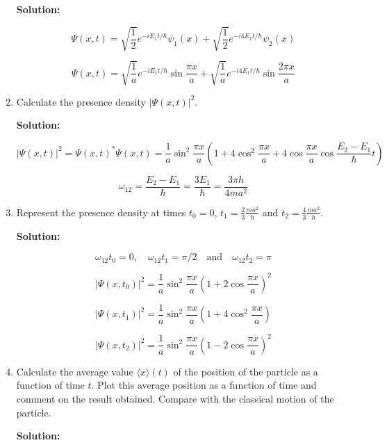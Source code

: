 \documentclass{article}
\begin{document}
\begin{enumerate}
        {\color{red}\textbf{Solution:}

        $$
        \Psi(x, t) = \sqrt{\frac{1}{2}} e^{-i E_{1} t / \hbar} \psi_{1}(x) + \sqrt{\frac{1}{2}} e^{-i 4 E_{1} t / \hbar} \psi_{2}(x)
        $$

        $$
        \Psi(x, t) = \sqrt{\frac{1}{a}} e^{-i E_{1} t / \hbar} \sin \frac{\pi x}{a} + \sqrt{\frac{1}{a}} e^{-i 4 E_{1} t / \hbar} \sin \frac{2 \pi x}{a}
        $$}

        \item Calculate the presence density $|\Psi(x, t)|^{2}$.

        {\color{red}\textbf{Solution:}

        $$
        |\Psi(x, t)|^{2} = \Psi(x, t)^{*} \Psi(x, t) = \frac{1}{a} \sin ^{2} \frac{\pi x}{a} \left(1 + 4 \cos ^{2} \frac{\pi x}{a} + 4 \cos \frac{\pi x}{a} \cos \frac{E_{2} - E_{1}}{\hbar} t\right)
        $$

        $$
        \omega_{12} = \frac{E_{2} - E_{1}}{\hbar} = \frac{3 E_{1}}{\hbar} = \frac{3 \pi h}{4 m a^{2}}
        $$}

        \item Represent the presence density at times $t_{0} = 0$, $t_{1} = \frac{2}{3} \frac{m a^{2}}{h}$ and $t_{2} = \frac{4}{3} \frac{m a^{2}}{h}$.

        {\color{red}\textbf{Solution:}

        $$
        \omega_{12} t_{0} = 0, \quad \omega_{12} t_{1} = \pi / 2 \quad \text{and} \quad \omega_{12} t_{2} = \pi
        $$

        $$
        \left|\Psi\left(x, t_{0}\right)\right|^{2} = \frac{1}{a} \sin ^{2} \frac{\pi x}{a} \left(1 + 2 \cos \frac{\pi x}{a}\right)^{2}
        $$

        $$
        \left|\Psi\left(x, t_{1}\right)\right|^{2} = \frac{1}{a} \sin ^{2} \frac{\pi x}{a} \left(1 + 4 \cos ^{2} \frac{\pi x}{a}\right)
        $$

        $$
        \left|\Psi\left(x, t_{2}\right)\right|^{2} = \frac{1}{a} \sin ^{2} \frac{\pi x}{a} \left(1 - 2 \cos \frac{\pi x}{a}\right)^{2}
        $$}

        \item Calculate the average value $\langle x \rangle(t)$ of the position of the particle as a function of time $t$. Plot this average position as a function of time and comment on the result obtained. Compare with the classical motion of the particle.

        {\color{red}\textbf{Solution:}

}
\end{enumerate}
\end{document}
